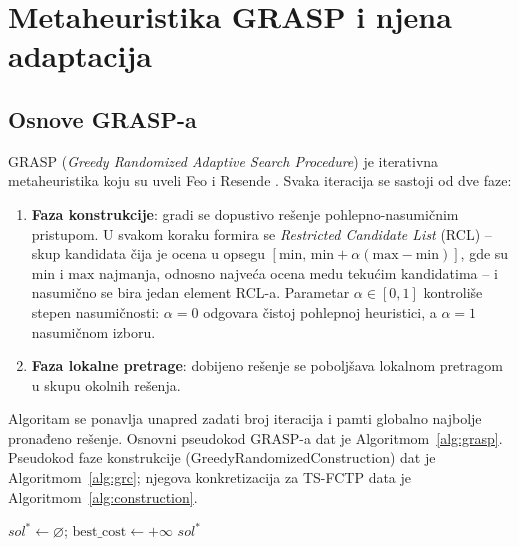 \documentclass[12pt,a4paper]{article}
\begin{document}
\section{Metaheuristika GRASP i njena adaptacija}

\subsection{Osnove GRASP-a}

GRASP (\textit{Greedy Randomized Adaptive Search Procedure}) je iterativna
metaheuristika koju su uveli Feo i Resende \cite{feo1995}. Svaka iteracija se
sastoji od dve faze:
\begin{enumerate}
  \item \textbf{Faza konstrukcije}: gradi se dopustivo rešenje
    pohlepno-nasumičnim pristupom. U svakom koraku formira se
    \textit{Restricted Candidate List} (RCL) -- skup kandidata čija je ocena u
    opsegu $[\text{min},\, \text{min} + \alpha(\text{max}-\text{min})]$, gde su
    $\text{min}$ i $\text{max}$ najmanja, odnosno najveća ocena medu tekućim
    kandidatima -- i nasumično se bira jedan element RCL-a. Parametar $\alpha \in [0,1]$
    kontroliše stepen nasumičnosti: $\alpha = 0$ odgovara čistoj pohlepnoj
    heuristici, a $\alpha = 1$ nasumičnom izboru.
  \item \textbf{Faza lokalne pretrage}: dobijeno rešenje se poboljšava
    lokalnom pretragom u skupu okolnih rešenja.
\end{enumerate}
Algoritam se ponavlja unapred zadati broj iteracija i pamti globalno najbolje
pronađeno rešenje. Osnovni pseudokod GRASP-a dat je Algoritmom~\ref{alg:grasp}. Pseudokod faze
konstrukcije (GreedyRandomizedConstruction) dat je Algoritmom~\ref{alg:grc};
njegova konkretizacija za TS-FCTP data je Algoritmom~\ref{alg:construction}.

\begin{algorithm}[H]
\caption{Osnovni GRASP$(T, \alpha)$}
\label{alg:grasp}
\SetAlgoLined
$sol^* \leftarrow \varnothing$;\quad
$\text{best\_cost} \leftarrow +\infty$\;
\Return $sol^*$
\end{algorithm}
\end{document}
